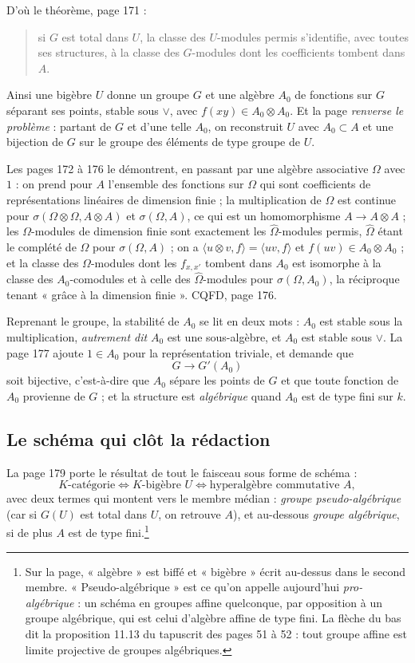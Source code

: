 \documentclass[11pt,a4paper]{article}
\begin{document}
D'où le théorème, page 171 :
\begin{quote}
si $G$ est total dans $U$, la classe des $U$-modules permis s'identifie, avec
toutes ses structures, à la classe des $G$-modules dont les coefficients
tombent dans $A$.
\end{quote}
Ainsi une bigèbre $U$ donne un groupe $G$ et une algèbre $A_{0}$ de fonctions
sur $G$ séparant ses points, stable sous $\vee$, avec $f(xy) \in A_{0} \otimes
A_{0}$. Et la page \emph{renverse le problème} : partant de $G$ et d'une telle
$A_{0}$, on reconstruit $U$ avec $A_{0} \subset A$ et une bijection de $G$ sur
le groupe des éléments de type groupe de $U$.

Les pages 172 à 176 le démontrent, en passant par une algèbre associative
$\Omega$ avec $1$ : on prend pour $A$ l'ensemble des fonctions sur $\Omega$ qui
sont coefficients de représentations linéaires de dimension finie ; la
multiplication de $\Omega$ est continue pour $\sigma(\Omega \otimes \Omega, A
\otimes A)$ et $\sigma(\Omega, A)$, ce qui est un homomorphisme $A \to A
\otimes A$ ; les $\Omega$-modules de dimension finie sont exactement les
$\hat{\Omega}$-modules permis, $\hat{\Omega}$ étant le complété de $\Omega$
pour $\sigma(\Omega, A)$ ; on a $\langle u \otimes v, f \rangle = \langle uv, f
\rangle$ et $f(uv) \in A_{0} \otimes A_{0}$ ; et la classe des
$\Omega$-modules dont les $f_{x,x'}$ tombent dans $A_{0}$ est isomorphe à la
classe des $A_{0}$-comodules et à celle des $\hat{\Omega}$-modules pour
$\sigma(\Omega, A_{0})$, la réciproque tenant « grâce à la dimension finie ».
CQFD, page 176.

Reprenant le groupe, la stabilité de $A_{0}$ se lit en deux mots : $A_{0}$ est
stable sous la multiplication, \emph{autrement dit} $A_{0}$ est une
sous-algèbre, et $A_{0}$ est stable sous $\vee$. La page 177 ajoute $1 \in
A_{0}$ pour la représentation triviale, et demande que
\[
G \longrightarrow G'(A_{0})
\]
soit bijective, c'est-à-dire que $A_{0}$ sépare les points de $G$ et que toute
fonction de $A_{0}$ provienne de $G$ ; et la structure est
\emph{algébrique} quand $A_{0}$ est de type fini sur $k$.

\subsection*{Le schéma qui clôt la rédaction}

La page 179 porte le résultat de tout le faisceau sous forme de schéma :
\[
K\text{-catégorie}
\iff
K\text{-bigèbre } U
\iff
\text{hyperalgèbre commutative } A ,
\]
avec deux termes qui montent vers le membre médian : \emph{groupe
pseudo-algébrique} (car si $G(U)$ est total dans $U$, on retrouve $A$), et
au-dessous \emph{groupe algébrique}, si de plus $A$ est de type
fini.\footnote{Sur la page, « algèbre » est biffé et « bigèbre » écrit
au-dessus dans le second membre. « Pseudo-algébrique » est ce qu'on appelle
aujourd'hui \emph{pro-algébrique} : un schéma en groupes affine quelconque, par
opposition à un groupe algébrique, qui est celui d'algèbre affine de type fini.
La flèche du bas dit la proposition 11.13 du tapuscrit des pages 51
à 52 : tout groupe affine est limite projective de groupes algébriques.}
\end{document}
